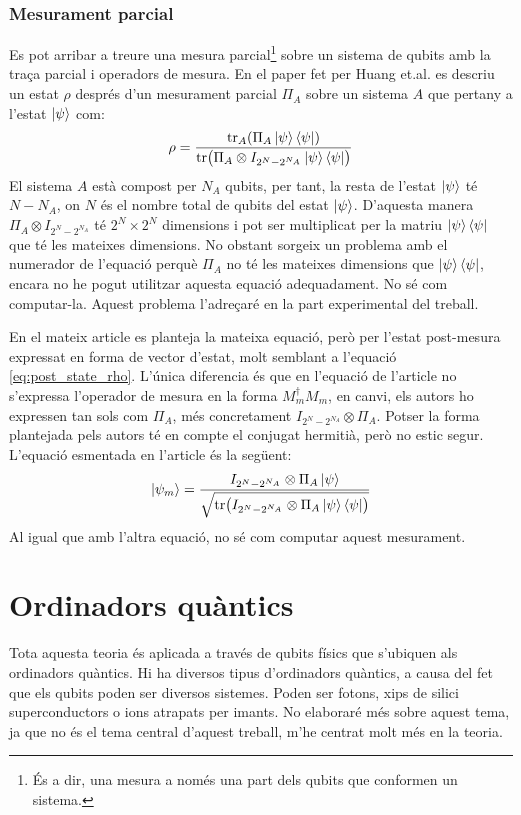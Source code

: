 \subsubsection{Mesurament parcial}
\label{par_measurament}
Es pot arribar a treure una mesura parcial\footnote{És a dir, una mesura a només una part dels qubits que conformen un sistema.} sobre un sistema de qubits amb la traça parcial i operadors de mesura. En el paper fet per Huang et.al. \cite{QGAN_exp} es descriu un estat $\rho$ després d'un mesurament parcial $\Pi_A$ sobre un sistema $A$ que pertany a l'estat $\ket{\psi}$ com:
$$
\rho = \frac{\tr_A(\Pi_A \ket{\psi}\bra{\psi})}{\tr(\Pi_A\otimes I_{2^N-2^{N_A}}\ket{\psi}\bra{\psi})}
$$
El sistema $A$ està compost per $N_A$ qubits, per tant, la resta de l'estat $\ket{\psi}$ té $N-N_A$, on $N$ és el nombre total de qubits del estat $\ket{\psi}$. D'aquesta manera $\Pi_A\otimes I_{2^N-2^{N_A}}$ té $2^N\times 2^N$ dimensions i pot ser multiplicat per la matriu $\ket{\psi}\bra{\psi}$ que té les mateixes dimensions. No obstant sorgeix un problema amb el numerador de l'equació perquè $\Pi_A$ no té les mateixes dimensions que $\ket{\psi}\bra{\psi}$, encara no he pogut utilitzar aquesta equació adequadament. No sé com computar-la. Aquest problema l'adreçaré en la part experimental del treball.

En el mateix article es planteja la mateixa equació, però per l'estat post-mesura expressat en forma de vector d'estat, molt semblant a l'equació \ref{eq:post_state_rho}. L'única diferencia és que en l'equació de l'article no s'expressa l'operador de mesura en la forma $M_m^\dagger M_m$, en canvi, els autors ho expressen tan sols com $\Pi_A$, més concretament $I_{2^N-2^{N_A}}\otimes \Pi_A$. Potser la forma plantejada pels autors té en compte el conjugat hermitià, però no estic segur.
L'equació esmentada en l'article és la següent:
$$
\ket{\psi_m} = \frac{I_{2^N-2^{N_A}}\otimes\Pi_A\ket{\psi}}{\sqrt{\tr(I_{2^N-2^{N_A}}\otimes\Pi_A\ket{\psi}\bra{\psi})}}
$$
Al igual que amb l'altra equació, no sé com computar aquest mesurament. 

\section{Ordinadors quàntics}
Tota aquesta teoria és aplicada a través de qubits físics que s'ubiquen als ordinadors quàntics. Hi ha diversos tipus d'ordinadors quàntics, a causa del fet que els qubits poden ser diversos sistemes. Poden ser fotons, xips de silici superconductors o ions atrapats per imants. No elaboraré més sobre aquest tema, ja que no és el tema central d'aquest treball, m'he centrat molt més en la teoria.

